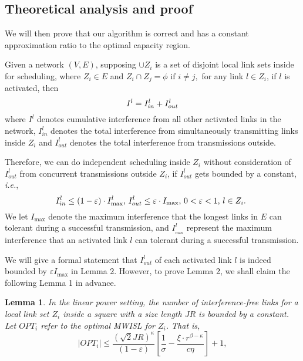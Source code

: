 \documentclass[journal]{IEEEtran}
\begin{document}
\subsection{Theoretical analysis and proof}
We will then prove that our algorithm is correct and has a constant approximation ratio to the optimal capacity region.

Given a network $(V,E)$, supposing  $\cup {Z_{i}}$ is a set of disjoint local link sets inside for scheduling, where $Z_i \in E$ and $Z_i \cap Z_j = \phi \mbox{~if~} i \neq j, $
for any link $l\in Z_{i} $, if $l$ is activated, then
{\small{\[
I^{l}=I_{in}^l +I_{out}^l
\vspace*{-0.5\baselineskip}\]}}
where $I^{l} $ denotes cumulative interference from all other activated links in the network, $I_{in}^l $ denotes the total interference from simultaneously transmitting
links inside $Z_{i} $ and $I_{out}^l $ denotes the total interference from transmissions outside.

Therefore, we can do independent scheduling inside $Z_i$ without consideration of $I_{out}^l$ from concurrent transmissions outside $Z_i$, if $I_{out}^l $ gets bounded by a constant, \emph{i.e.},
\vspace*{-0.25\baselineskip}
{\small{
\[ I_{in}^l \le (1-\varepsilon) \cdot I_{\max}^l \mbox{, }
 I_{out}^l \le \varepsilon \cdot I_{\max } \mbox{, } 0< \varepsilon <1
 \mbox{, } l\in Z_{i}  \mbox{. }
 \vspace*{-0.5\baselineskip}\]}}
We let $I_{\max } $ denote the maximum interference that the longest links in $E$ can
tolerant during a successful transmission, and $I_{_{\max } }^l $ represent the maximum interference
that  an activated link $l$ can tolerant during a successful transmission.

We will give a formal statement that  $I_{out}^l$ of each activated link $l$ is indeed bounded by $\varepsilon I_{\max}$ in Lemma 2. However, to prove Lemma 2, we shall claim the following Lemma 1 in advance.

\newtheorem{lemma}{Lemma}
\begin{lemma}
In the linear power setting, the number of interference-free links for a local
link set $Z_i $ inside a square  with a size length $JR$ is bounded by a constant. Let $OPT_{i}$ refer to the optimal MWISL for $Z_i$. That is,
{\small{
\[\left| {OPT_{i}}
\right|\le \frac{(\sqrt 2 JR)^\kappa }{(1-\varepsilon )}\left[
{\frac{1}{\sigma }-\frac{\xi \cdot r^{\beta -\kappa
}}{c\eta }} \right]+1,\]}}
\vspace*{-0.5\baselineskip}
\label{lemma1}
\end{lemma}
\end{document}
